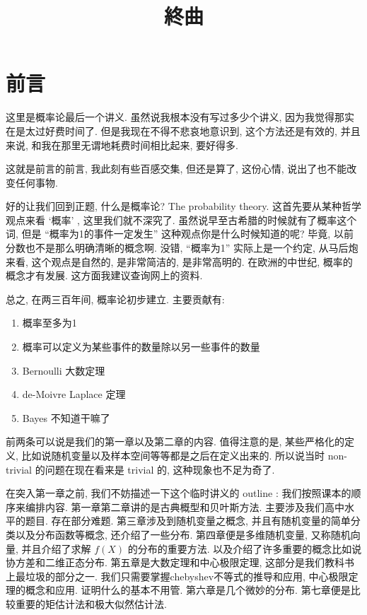 \documentclass[a4paper, 10pt]{ctexart} %
\title{終曲}
\begin{document}
\maketitle
\tableofcontents
\section{前言}
这里是概率论最后一个讲义. 虽然说我根本没有写过多少个讲义, 因为我觉得那实在是太过好费时间了.
但是我现在不得不悲哀地意识到, 这个方法还是有效的, 并且来说, 和我在那里无谓地耗费时间相比起来, 
要好得多. 

这就是前言的前言, 我此刻有些百感交集, 但还是算了, 这份心情, 说出了也不能改变任何事物. 

好的让我们回到正题, 什么是概率论? The probability theory. 这首先要从某种哲学观点来看 `概率' , 这里我们就不深究了. 
虽然说早至古希腊的时候就有了概率这个词, 但是 ``概率为1的事件一定发生'' 这种观点你是什么时候知道的呢? 毕竟, 以前分数也不是那么明确清晰的概念啊.
没错, ``概率为1'' 实际上是一个约定, 从马后炮来看, 这个观点是自然的, 是非常简洁的, 是非常高明的. 
在欧洲的中世纪, 概率的概念才有发展. 这方面我建议查询网上的资料. 

总之, 在两三百年间, 概率论初步建立. 主要贡献有:
\begin{enumerate}
    \item 概率至多为1
    \item 概率可以定义为某些事件的数量除以另一些事件的数量
    \item Bernoulli 大数定理
    \item de-Moivre Laplace 定理
    \item Bayes 不知道干嘛了
\end{enumerate}
前两条可以说是我们的第一章以及第二章的内容. 值得注意的是, 某些严格化的定义, 比如说随机变量以及样本空间等等都是之后在定义出来的. 所以说当时 non-trivial 的问题在现在看来是 trivial 的, 这种现象也不足为奇了.

在突入第一章之前, 我们不妨描述一下这个临时讲义的 outline : 我们按照课本的顺序来编排内容. 第一章第二章讲的是古典概型和贝叶斯方法. 主要涉及我们高中水平的题目. 存在部分难题. 
第三章涉及到随机变量之概念, 并且有随机变量的简单分类以及分布函数等概念, 还介绍了一些分布. 第四章便是多维随机变量, 又称随机向量, 并且介绍了求解 $f(X) $ 的分布的重要方法. 
以及介绍了许多重要的概念比如说协方差和二维正态分布. 第五章是大数定理和中心极限定理, 这部分是我们教科书上最垃圾的部分之一. 我们只需要掌握chebyshev不等式的推导和应用, 中心极限定理的概念和应用. 
证明什么的基本不用管. 第六章是几个微妙的分布. 第七章便是比较重要的矩估计法和极大似然估计法. 
\end{document}
